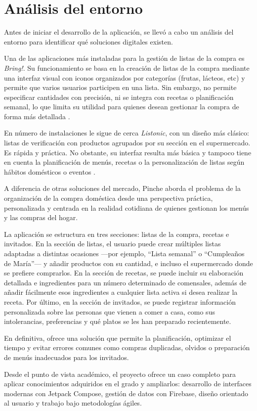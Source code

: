 \section{Análisis del entorno}

Antes de iniciar el desarrollo de la aplicación, se llevó a cabo un análisis del entorno para identificar qué soluciones digitales existen.

Una de las aplicaciones más instaladas para la gestión de listas de la compra es \textit{Bring!}. Su funcionamiento se basa en la creación de listas de la compra mediante una interfaz visual con iconos organizados por categorías (frutas, lácteos, etc) y permite que varios usuarios participen en una lista. Sin embargo, no permite especificar cantidades con precisión, ni se integra con recetas o planificación semanal, lo que limita su utilidad para quienes desean gestionar la compra de forma más detallada \cite{bring}.

En número de instalaciones le sigue de cerca \textit{Listonic}, con un diseño más clásico: listas de verificación con productos agrupados por su sección en el supermercado. Es rápida y práctica. No obstante, su interfaz resulta más básica y tampoco tiene en cuenta la planificación de menús, recetas o la personalización de listas según hábitos domésticos o eventos \cite{listonic}.

A diferencia de otras soluciones del mercado, Pinche aborda el problema de la organización de la compra doméstica desde una perspectiva práctica, personalizada y centrada en la realidad cotidiana de quienes gestionan los menús y las compras del hogar.

La aplicación se estructura en tres secciones: listas de la compra, recetas e invitados. En la sección de listas, el usuario puede crear múltiples listas adaptadas a distintas ocasiones —por ejemplo, “Lista semanal” o “Cumpleaños de María”— y añadir productos con su cantidad, e incluso el supermercado donde se prefiere comprarlos. En la sección de recetas, se puede incluir su elaboración detallada e ingredientes para un número determinado de comensales, además de añadir fácilmente esos ingredientes a cualquier lista activa si desea realizar la receta. Por último, en la sección de invitados, se puede registrar información personalizada sobre las personas que vienen a comer a casa, como sus intolerancias, preferencias y qué platos se les han preparado recientemente.

En definitiva, ofrece una solución que permite la planificación, optimizar el tiempo y evitar errores comunes como compras duplicadas, olvidos o preparación de menús inadecuados para los invitados.

Desde el punto de vista académico, el proyecto ofrece un caso completo para aplicar conocimientos adquiridos en el grado y ampliarlos: desarrollo de interfaces modernas con Jetpack Compose, gestión de datos con Firebase, diseño orientado al usuario y trabajo bajo metodologías ágiles.
